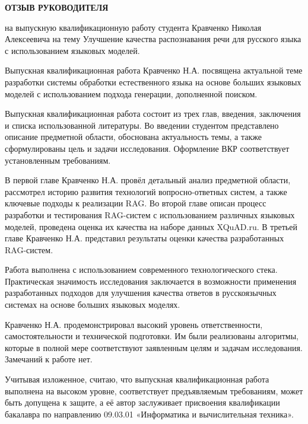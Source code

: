 \newpage
\clearpage
\begin{center}
    \textbf{ОТЗЫВ РУКОВОДИТЕЛЯ}
\end{center}

на выпускную квалификационную работу студента Кравченко Николая Алексеевича на тему Улучшение качества распознавания речи для русского языка с использованием языковых моделей.

Выпускная квалификационная работа Кравченко Н.А. посвящена актуальной теме разработки системы обработки естественного языка на основе больших языковых моделей с использованием подхода генерации, дополненной поиском.

Выпускная квалификационная работа состоит из трех глав, введения, заключения и списка использованной литературы. Во введении студентом представлено описание предметной области, обоснована актуальность темы, а также сформулированы цель и задачи исследования. Оформление ВКР соответствует установленным требованиям.

В первой главе Кравченко Н.А. провёл детальный анализ предметной области, рассмотрел историю развития технологий вопросно-ответных систем, а также ключевые подходы к реализации RAG. Во второй главе описан процесс разработки и тестирования RAG-систем с использованием различных языковых моделей, проведена оценка их качества на наборе данных XQuAD.ru. В третьей главе Кравченко Н.А. представил результаты оценки качества разработанных RAG-систем.

Работа выполнена с использованием современного технологического стека. Практическая значимость исследования заключается в возможности применения разработанных подходов для улучшения качества ответов в русскоязычных системах на основе больших языковых моделях.

Кравченко Н.А. продемонстрировал высокий уровень ответственности, самостоятельности и технической подготовки. Им были реализованы алгоритмы, которые в полной мере соответствуют заявленным целям и задачам исследования. Замечаний к работе нет.

\newpage
Учитывая изложенное, считаю, что выпускная квалификационная работа выполнена на высоком уровне, соответствует предъявляемым требованиям, может быть допущена к защите, а её автор заслуживает присвоения квалификации бакалавра по направлению 09.03.01 «Информатика и вычислительная техника».
\thispagestyle{empty}
